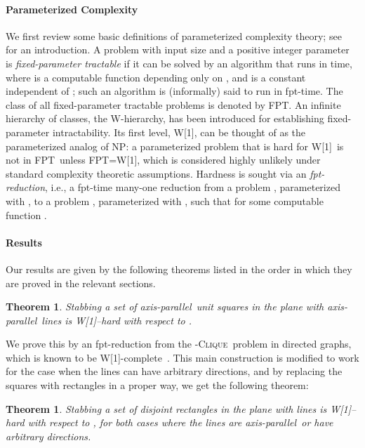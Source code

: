 \documentclass[12pt]{article}
\newtheorem{theorem}[definition]{Theorem}
\newcommand{\cclass}[1]{{#1}}
\newcommand{\problem}[1]{\textsc{#1}}
\newcommand{\fpt}{\cclass{FPT}}
\newcommand{\wone}{\cclass{W[1]}}
\newcommand{\clique}{\problem{Clique}}
\newcommand{\ap}{a.p.\ }
\renewcommand{\ap}{axis-parallel\ }
\begin{document}
\paragraph{Parameterized Complexity}
We first review some basic definitions of parameterized complexity theory;
see~\cite{DF99,FG06} for an introduction.
A problem with input size  and a positive integer parameter~ is
\emph{fixed-parameter tractable} if it can be solved by an algorithm that
runs in  time, where  is a computable function
depending only on , and  is a constant independent of ; such an
algorithm is (informally) said to run in fpt-time.  The class of all
fixed-parameter tractable problems is denoted by \fpt. An infinite
hierarchy of classes, the W-hierarchy, has been introduced for establishing
fixed-parameter intractability.  Its first level, \wone, can be thought of
as the parameterized analog of NP: a parameterized problem that is hard for
\wone\ is not in \fpt\ unless \fpt=\wone, which is considered highly
unlikely under standard complexity theoretic assumptions.  Hardness is
sought via an \emph{fpt-reduction}, i.e., a fpt-time many-one reduction
from a problem , parameterized with , to a problem ,
parameterized with , such that  for some computable
function .

\paragraph{Results}

Our results are given by the following theorems listed in the order in which they are proved in the relevant sections.

\begin{theorem}\label{thm:wonehardunitsquaresap} 
Stabbing a set of \ap unit squares in the plane with  \ap lines is \wone--hard with respect to .
\end{theorem}

We prove this by an fpt-reduction from the -\clique\ problem in directed
graphs, which is known to be W[1]-complete~\cite{FG06}. 
This main construction is modified to work for the case when the lines can have arbitrary directions, and 
by replacing the squares with rectangles in a proper way, we get the following theorem:

\begin{theorem}\label{thm:woneharddisjointrectanglesap}  
Stabbing a set of disjoint rectangles in the plane with  lines is \wone--hard with respect to , 
for both cases where the lines are \ap or have arbitrary directions.
\end{theorem}
\end{document}
